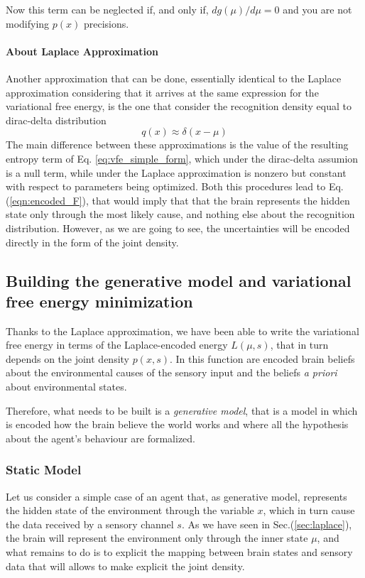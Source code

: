 \documentclass[10pt]{article}
\begin{document}
Now this term can be neglected if, and only if, $d g(\mu) / d \mu = 0$ and you are not modifying $p(x)$ precisions.

\paragraph{About Laplace Approximation}
Another approximation that can be done, essentially identical to the Laplace approximation considering that it arrives at the same expression for the variational free energy, is the one that consider the recognition density equal to dirac-delta distribution
\begin{equation}
    q(x) \approx \delta (x - \mu)
\end{equation}
The main difference between these approximations is the value of the resulting entropy term of Eq. \ref{eq:vfe_simple_form}, which under the dirac-delta assumion is a null term, while under the Laplace approximation is nonzero but constant with respect to parameters being optimized. 
Both this procedures lead to Eq.(\ref{eqn:encoded_F}), that would imply that that the brain represents the hidden state only through the most likely cause, and nothing else about the recognition distribution. However, as we are going to see, the uncertainties will be encoded directly in the form of the joint density.

\subsection{Building the generative model and variational free energy minimization}
\label{sec:G}
Thanks to the Laplace approximation, we have been able to write the variational free energy in terms of the Laplace-encoded energy $L(\mu,s)$, that in turn depends on the joint density $p(x, s)$. In this function are encoded brain beliefs about the environmental causes of the sensory input and the beliefs \emph{a priori} about environmental states.

Therefore, what needs to be built is a \emph{generative model}, that is a model in which is encoded how the brain believe the world works and where all the hypothesis about the agent's behaviour are formalized.

\subsubsection{Static Model}

Let us consider a simple case of an agent that, as generative model, represents the hidden state of the environment through the variable $x$, which in turn cause the data received by a sensory channel $s$. As we have seen in Sec.(\ref{sec:laplace}), the brain will represent the environment only through the inner state $\mu$, and what remains to do is to explicit the mapping between brain states and sensory data that will allows to make explicit the joint density.
\end{document}
